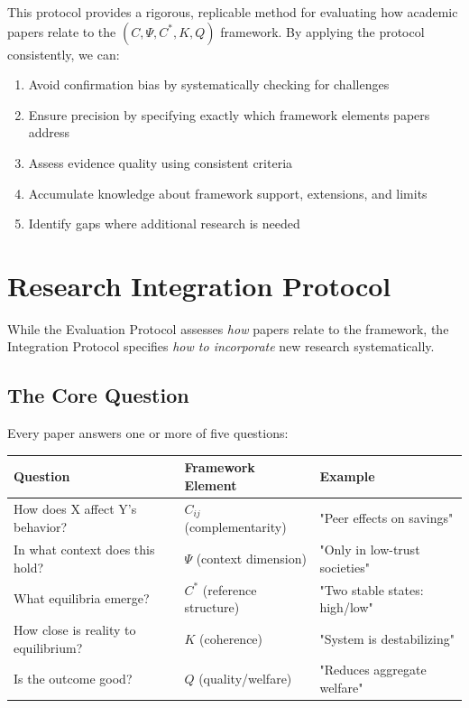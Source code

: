 This protocol provides a rigorous, replicable method for evaluating how academic papers
relate to the $(C, \Psi, C^*, K, Q)$ framework. By applying the protocol consistently, we can:
\begin{enumerate}
  \item Avoid confirmation bias by systematically checking for challenges
  \item Ensure precision by specifying exactly which framework elements papers address
  \item Assess evidence quality using consistent criteria
  \item Accumulate knowledge about framework support, extensions, and limits
  \item Identify gaps where additional research is needed
\end{enumerate}

\section{Research Integration Protocol}
\label{sec:integration-protocol}

While the Evaluation Protocol assesses \emph{how} papers relate to the framework,
the Integration Protocol specifies \emph{how to incorporate} new research systematically.

\subsection{The Core Question}

Every paper answers one or more of five questions:

\begin{center}
\renewcommand{\arraystretch}{1.4}
\begin{tabular}{|l|l|l|}
\hline
\textbf{Question} & \textbf{Framework Element} & \textbf{Example} \\
\hline
How does X affect Y's behavior? & $C_{ij}$ (complementarity) & "Peer effects on savings" \\
In what context does this hold? & $\Psi$ (context dimension) & "Only in low-trust societies" \\
What equilibria emerge? & $C^*$ (reference structure) & "Two stable states: high/low" \\
How close is reality to equilibrium? & $K$ (coherence) & "System is destabilizing" \\
Is the outcome good? & $Q$ (quality/welfare) & "Reduces aggregate welfare" \\
\hline
\end{tabular}
\end{center}

